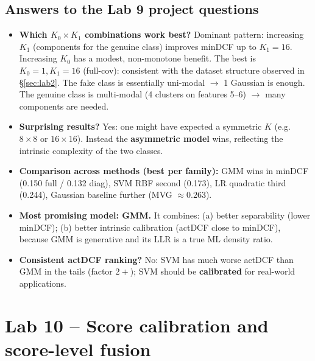 \documentclass[11pt,a4paper]{article}
\begin{document}
\subsection{Answers to the Lab 9 project questions}

\begin{itemize}
\item \textbf{Which $K_0 \times K_1$ combinations work best?}
      Dominant pattern: increasing $K_1$ (components for the genuine
      class) improves minDCF up to $K_1=16$. Increasing $K_0$ has a
      modest, non-monotone benefit. The best is $K_0=1, K_1=16$
      (full-cov): consistent with the dataset structure observed in
      \S\ref{sec:lab2}. The fake class is essentially uni-modal
      $\rightarrow$ 1 Gaussian is enough. The genuine class is
      multi-modal (4 clusters on features 5--6) $\rightarrow$ many
      components are needed.

\item \textbf{Surprising results?} Yes: one might have expected a
      symmetric $K$ (e.g.\ $8\times 8$ or $16\times 16$). Instead the
      \textbf{asymmetric model} wins, reflecting the intrinsic
      complexity of the two classes.

\item \textbf{Comparison across methods (best per family):} GMM wins
      in minDCF (0.150 full / 0.132 diag), SVM RBF second (0.173),
      LR quadratic third (0.244), Gaussian baseline further
      (MVG $\approx 0.263$).

\item \textbf{Most promising model: GMM.} It combines:
      (a) better separability (lower minDCF);
      (b) better intrinsic calibration (actDCF close to minDCF),
      because GMM is generative and its LLR is a true ML density
      ratio.

\item \textbf{Consistent actDCF ranking?} No: SVM has much worse
      actDCF than GMM in the tails (factor $2+$); SVM should be
      \textbf{calibrated} for real-world applications.
\end{itemize}

\section{Lab 10 -- Score calibration and score-level fusion}\label{sec:lab10}
\end{document}

